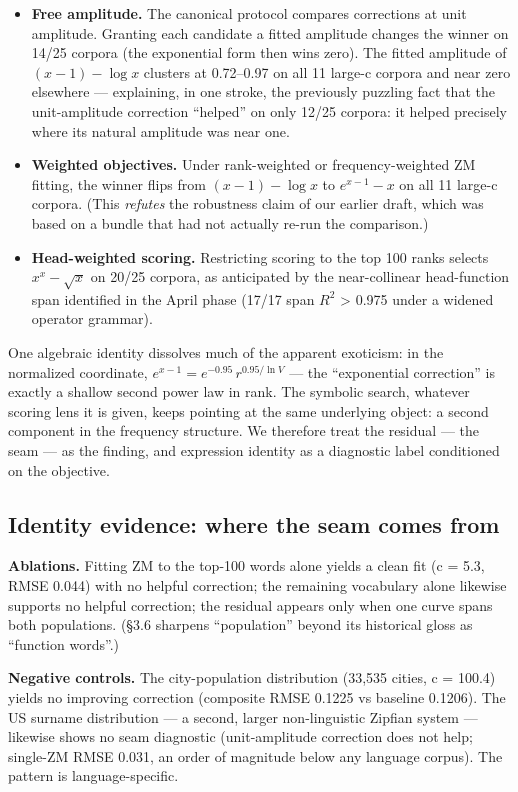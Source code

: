 \documentclass[11pt]{article}
\begin{document}
\begin{itemize}
\item \textbf{Free amplitude.} The canonical protocol compares corrections at unit
amplitude. Granting each candidate a fitted amplitude changes the winner on
14/25 corpora (the exponential form then wins zero). The fitted amplitude of
$(x-1)-\log x$ clusters at 0.72--0.97 on all 11 large-c corpora and near zero
elsewhere --- explaining, in one stroke, the previously puzzling fact that the
unit-amplitude correction ``helped'' on only 12/25 corpora: it helped precisely
where its natural amplitude was near one.
\item \textbf{Weighted objectives.} Under rank-weighted or frequency-weighted ZM fitting,
the winner flips from $(x-1)-\log x$ to $e^{x-1}-x$ on all 11 large-c corpora.
(This \emph{refutes} the robustness claim of our earlier draft, which was based on a
bundle that had not actually re-run the comparison.)
\item \textbf{Head-weighted scoring.} Restricting scoring to the top 100 ranks selects
$x^{x}-\sqrt{x}$ on 20/25 corpora, as anticipated by the near-collinear head-function
span identified in the April phase (17/17 span $R^2$ > 0.975 under a widened
operator grammar).
\end{itemize}
One algebraic identity dissolves much of the apparent exoticism: in the normalized coordinate, $e^{x-1} = e^{-0.95}\,r^{0.95/\ln V}$ --- the ``exponential correction'' is exactly a shallow second power law in rank. The symbolic search, whatever scoring lens it is given, keeps pointing at the same underlying object: a second component in the frequency structure. We therefore treat the residual --- the seam --- as the finding, and expression identity as a diagnostic label conditioned on the objective.

\subsection{Identity evidence: where the seam comes from}
\textbf{Ablations.} Fitting ZM to the top-100 words alone yields a clean fit (c = 5.3, RMSE 0.044) with no helpful correction; the remaining vocabulary alone likewise supports no helpful correction; the residual appears only when one curve spans both populations. (\S3.6 sharpens ``population'' beyond its historical gloss as ``function words''.)

\textbf{Negative controls.} The city-population distribution (33,535 cities, c = 100.4) yields no improving correction (composite RMSE 0.1225 vs baseline 0.1206). The US surname distribution --- a second, larger non-linguistic Zipfian system --- likewise shows no seam diagnostic (unit-amplitude correction does not help; single-ZM RMSE 0.031, an order of magnitude below any language corpus). The pattern is language-specific.
\end{document}
